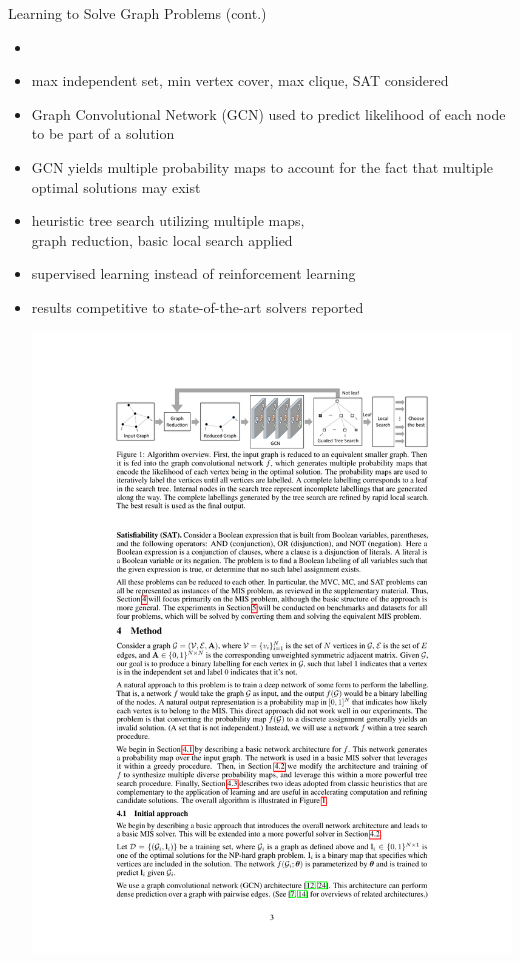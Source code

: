 \documentclass[aspectratio=1610]{beamer}
\newcommand{\important}[1]{{\color{green!60!black}#1}}
\begin{document}
\begin{frame}{Learning to Solve Graph Problems (cont.)}
\begin{itemize}
	\itemsep1ex
	\item {}
	\item max independent set, min vertex cover, max clique, SAT considered
	\item \important{Graph Convolutional Network (GCN)} used to predict likelihood of each node to be part of a solution
	\item GCN yields \important{multiple probability maps} to account for the fact that multiple optimal solutions may exist
	\item \important{heuristic tree search} utilizing multiple maps,\\ \important{graph reduction, basic local search} applied
	\item \important{supervised learning} instead of reinforcement learning
	\item results competitive to state-of-the-art solvers reported 
	\medskip
	\begin{center}
		\includegraphics[width=1\linewidth]{graphics/li}
	\end{center}
\end{itemize}
\end{frame}
\end{document}
